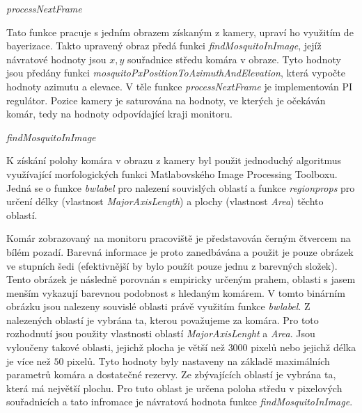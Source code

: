 \documentclass[a4paper,10pt]{article}
\begin{document}
\vspace{0.5cm}
\textit{processNextFrame}

Tato funkce pracuje s jedním obrazem získaným z kamery, upraví ho využitím de bayerizace. Takto upravený obraz předá funkci \textit{findMosquitoInImage}, jejíž návratové hodnoty jsou $x, y$ souřadnice středu komára v obraze. Tyto hodnoty jsou předány funkci \textit{mosquitoPxPositionToAzimuthAndElevation}, která vypočte hodnoty azimutu a elevace. V těle funkce \textit{processNextFrame} je implementován PI regulátor. Pozice kamery je saturována na hodnoty, ve kterých je očekáván komár, tedy na hodnoty odpovídající kraji monitoru. 

\vspace{0.5cm}
\textit{findMosquitoInImage}

K získání polohy komára v obrazu z kamery byl použit jednoduchý algoritmus využívající morfologických funkci Matlabovského Image Processing Toolboxu. Jedná se o funkce \textit{bwlabel} pro nalezení souvislých oblastí a funkce \textit{regionprops} pro určení délky (vlastnost \textit{MajorAxisLength}) a plochy (vlastnost \textit{Area}) těchto oblastí.

Komár zobrazovaný na monitoru pracoviště je představován černým čtvercem na bílém pozadí. Barevná informace je proto zanedbávána a použit je pouze obrázek ve stupních šedi (efektivnější by bylo použít pouze jednu z barevných složek). Tento obrázek je následně porovnán s empiricky určeným prahem, oblasti s jasem menším vykazují barevnou podobnost s hledaným komárem. V tomto binárním obrázku jsou nalezeny souvislé oblasti právě využitím funkce \textit{bwlabel}. Z nalezených oblastí je vybrána ta, kterou považujeme za komára. Pro toto rozhodnutí jsou použity vlastnosti oblastí \textit{MajorAxisLenght} a \textit{Area}. Jsou vyloučeny takové oblasti, jejichž plocha je větší než $3000$ pixelů nebo jejichž délka je více než $50$ pixelů. Tyto hodnoty byly nastaveny na základě maximálních parametrů komára a dostatečné rezervy. Ze zbývajících oblastí je vybrána ta, která má největší plochu. Pro tuto oblast je určena poloha středu v pixelových souřadnicích a tato infromace je návratová hodnota funkce \textit{findMosquitoInImage}.

\end{document}
